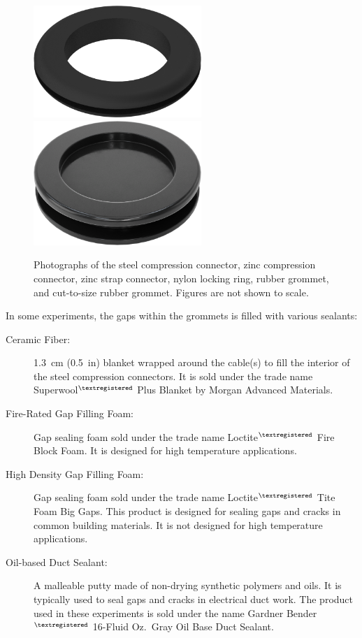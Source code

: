 \begin{figure}[p]
\hfill \\
\hfill \\
\includegraphics[width=2.5in]{../FIGURES/Rubber_Grommet} \hfill
\includegraphics[width=2.5in]{../FIGURES/Solid_Rubber_Grommet}
\caption[Photographs of the various grommets]{Photographs of the steel compression connector, zinc compression connector, zinc strap connector, nylon locking ring, rubber grommet, and cut-to-size rubber grommet. Figures are not shown to scale.}
\label{grommet_photo}
\end{figure}


In some experiments, the gaps within the grommets is filled with various sealants:
\begin{description}
\item[Ceramic Fiber:] 1.3~cm (0.5~in) blanket wrapped around the cable(s) to fill the interior of the steel compression connectors. It is sold under the trade name Superwool$^{\textregistered}$ Plus Blanket by Morgan Advanced Materials.
\item[Fire-Rated Gap Filling Foam:] Gap sealing foam sold under the trade name Loctite$^{\textregistered}$ Fire Block Foam. It is designed for high temperature applications.
\item[High Density Gap Filling Foam:] Gap sealing foam sold under the trade name Loctite$^{\textregistered}$ Tite Foam Big Gaps. This product is designed for sealing gaps and cracks in common building materials. It is not designed for high temperature applications.
\item[Oil-based Duct Sealant:] A malleable putty made of non-drying synthetic polymers and oils. It is typically used to seal gaps and cracks in electrical duct work. The product used in these experiments is sold under the name Gardner Bender$^{\textregistered}$ 16-Fluid Oz.~Gray Oil Base Duct Sealant.
\end{description}

